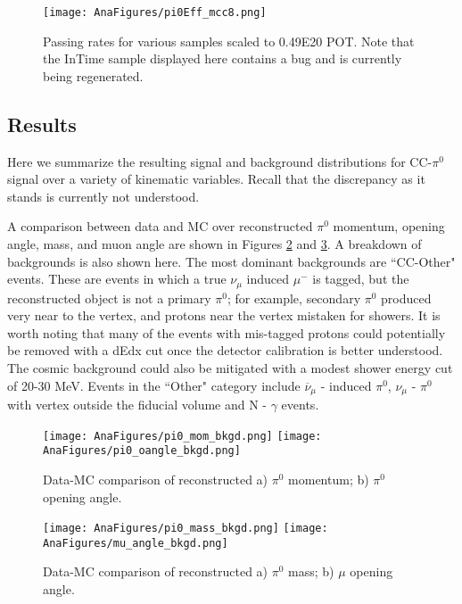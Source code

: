 \documentclass[12pt]{article}
\begin{document}
\begin{figure}[h!]
\texttt{[image: AnaFigures/pi0Eff\_mcc8.png]}
\caption{ Passing rates for various samples scaled to 0.49E20 POT. Note that the InTime sample displayed here contains a bug and is currently being regenerated. }
\label{fig:pi0Eff_mcc8}
\end{figure}

\clearpage
\subsection{Results}
Here we summarize the resulting signal and background distributions for CC-$\pi^0$ signal over a variety of kinematic variables. Recall that the discrepancy as it stands is currently not understood. 
\par A comparison between data and MC over reconstructed $\pi^0$ momentum, opening angle, mass, and muon angle are shown in Figures \ref{fig:ccpi0_mom_angle} and \ref{fig:ccpi0_mass_angle}. A breakdown of backgrounds is also shown here. The most dominant backgrounds are ``CC-Other" events.  These are events in which a true $\nu_{\mu}$ induced $\mu^-$ is tagged, but the reconstructed object is not a primary $\pi^0$; for example, secondary $\pi^0$ produced very near to the vertex, and protons near the vertex mistaken for showers. It is worth noting that many of the events with mis-tagged protons could potentially be removed with a dEdx cut once the detector calibration is better understood. The cosmic background could also be mitigated with a modest shower energy cut of 20-30 MeV.  Events in the ``Other" category include $\overline{\nu}_{\mu}$ - induced $\pi^0$, $\nu_{\mu}$ - $\pi^0$ with vertex outside the fiducial volume and N - $\gamma$ events. 
\begin{figure}[h!]
\centering
\texttt{[image: AnaFigures/pi0\_mom\_bkgd.png]}
\hspace{1 mm}
\texttt{[image: AnaFigures/pi0\_oangle\_bkgd.png]}
\caption{Data-MC comparison of reconstructed a) $\pi^0$ momentum; b) $\pi^0$ opening angle. }
\label{fig:ccpi0_mom_angle}
\end{figure}

\begin{figure}[h!]
\centering
\texttt{[image: AnaFigures/pi0\_mass\_bkgd.png]}
\hspace{1 mm}
\texttt{[image: AnaFigures/mu\_angle\_bkgd.png]}
\caption{Data-MC comparison of reconstructed a) $\pi^0$ mass; b) $\mu$ opening angle. }
\label{fig:ccpi0_mass_angle}
\end{figure}
\end{document}

